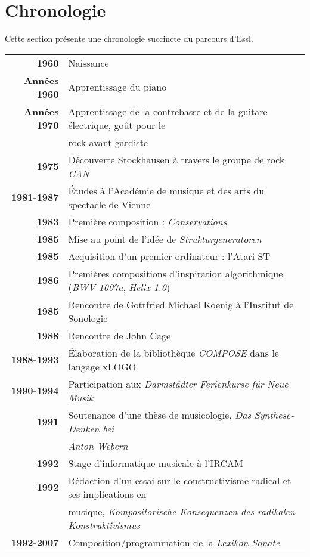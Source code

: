 \documentclass[a4paper,12pt]{article}
\begin{document}
\newpage
\section{Chronologie}

Cette section présente une chronologie succincte du parcours d'Essl.

\begin{tabular}{rl}
\textbf{1960} & Naissance \\
\textbf{Années 1960} & Apprentissage du piano \\
\textbf{Années 1970} & Apprentissage de la contrebasse et de la guitare électrique, goût pour le \\ & rock avant-gardiste \\
\textbf{1975} & Découverte Stockhausen à travers le groupe de rock \emph{CAN} \\
\textbf{1981-1987} & Études à l'Académie de musique et des arts du spectacle de Vienne \\
\textbf{1983} & Première composition : \emph{Conservations} \\
\textbf{1985} & Mise au point de l'idée de \emph{Strukturgeneratoren} \\
\textbf{1985} & Acquisition d'un premier ordinateur : l'Atari ST \\
\textbf{1986} & Premières compositions d'inspiration algorithmique (\emph{BWV 1007a}, \emph{Helix 1.0}) \\
\textbf{1985} & Rencontre de Gottfried Michael Koenig à l'Institut de Sonologie \\
\textbf{1988} & Rencontre de John Cage \\
\textbf{1988-1993} & Élaboration de la bibliothèque \emph{COMPOSE} dans le langage xLOGO \\
\textbf{1990-1994} & Participation aux \emph{Darmstädter Ferienkurse für Neue Musik} \\
\textbf{1991} & Soutenance d'une thèse de musicologie, \emph{Das Synthese-Denken bei} \\ & \emph{Anton Webern} \\
\textbf{1992} & Stage d'informatique musicale à l'IRCAM \\
\textbf{1992} & Rédaction d'un essai sur le constructivisme radical et ses implications en \\ & musique, \emph{Kompositorische Konsequenzen des radikalen Konstruktivismus} \\
\textbf{1992-2007} & Composition/programmation de la \emph{Lexikon-Sonate} \\

\end{tabular}
\end{document}
